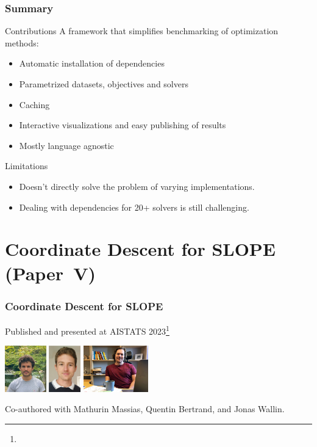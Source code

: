 \documentclass[10pt]{beamer}
\begin{document}
\begin{frame}
  \frametitle{Summary}

  \begin{exampleblock}{Contributions}
    A framework that simplifies benchmarking of optimization methods:
    \begin{itemize}
      \item Automatic installation of dependencies
      \item Parametrized datasets, objectives and solvers
      \item Caching
      \item Interactive visualizations and easy publishing of results
      \item Mostly language agnostic
    \end{itemize}
  \end{exampleblock}

  \pause

  \begin{alertblock}{Limitations}
    \begin{itemize}
      \item Doesn't directly solve the problem of varying implementations.
      \item Dealing with dependencies for 20+ solvers is still challenging.
    \end{itemize}
  \end{alertblock}
\end{frame}

\section{Coordinate Descent for SLOPE (Paper~V)}

\begin{frame}[c]
  \frametitle{Coordinate Descent for SLOPE}

  Published and presented at AISTATS 2023\footnote{}

  \begin{center}
    \hfill%
    \includegraphics[height=2cm]{figures/mathurin.jpg}\hfill%
    \includegraphics[height=2cm]{figures/quentin.png}\hfill%
    \includegraphics[height=2cm]{figures/jonas.jpg}\hfill\null
  \end{center}

  Co-authored with Mathurin Massias, Quentin Bertrand, and Jonas Wallin.

\end{frame}
\end{document}
